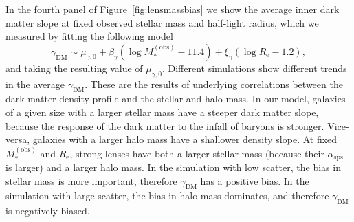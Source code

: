 \documentclass{aa}
\def\reff{R_{\mathrm{e}}}
\def\asps{\alpha_{\mathrm{sps}}}
\def\mobs{M_*^{(\mathrm{obs})}}
\def\gammadm{\gamma_{\mathrm{DM}}}
\def\Fref#1{Figure~\ref{#1}\xspace}
\begin{document}
In the fourth panel of \Fref{fig:lensmassbias} we show the average inner dark matter slope at fixed observed stellar mass and half-light radius, which we measured by fitting the following model
\begin{equation}\label{eq:dmscaling}
\gammadm \sim \mu_{\gamma,0} + \beta_{\gamma}(\log{\mobs} - 11.4) + \xi_{\gamma}(\log{\reff} - 1.2),
\end{equation}
and taking the resulting value of $\mu_{\gamma,0}$.
Different simulations show different trends in the average $\gammadm$.
These are the results of underlying correlations between the dark matter density profile and the stellar and halo mass.
In our model, galaxies of a given size with a larger stellar mass have a steeper dark matter slope, because the response of the dark matter to the infall of baryons is stronger. Vice-versa, galaxies with a larger halo mass have a shallower density slope.
At fixed $\mobs$ and $\reff$, strong lenses have both a larger stellar mass (because their $\asps$ is larger) and a larger halo mass.
In the simulation with low scatter, the bias in stellar mass is more important, therefore $\gammadm$ has a positive bias. In the simulation with large scatter, the bias in halo mass dominates, and therefore $\gammadm$ is negatively biased.
\end{document}
